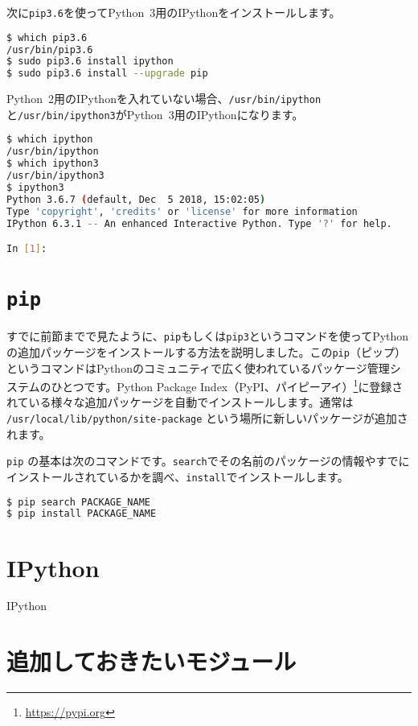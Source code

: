 次に\texttt{pip3.6}を使ってPython~3用のIPythonをインストールします。

\begin{lstlisting}[language=bash]
$ which pip3.6 
/usr/bin/pip3.6
$ sudo pip3.6 install ipython
$ sudo pip3.6 install --upgrade pip
\end{lstlisting}

Python~2用のIPythonを入れていない場合、\texttt{/usr/bin/ipython}と\texttt{/usr/bin/ipython3}がPython~3用のIPythonになります。

\begin{lstlisting}[language=bash]
$ which ipython
/usr/bin/ipython
$ which ipython3
/usr/bin/ipython3
$ ipython3 
Python 3.6.7 (default, Dec  5 2018, 15:02:05) 
Type 'copyright', 'credits' or 'license' for more information
IPython 6.3.1 -- An enhanced Interactive Python. Type '?' for help.

In [1]:
\end{lstlisting}

\section{\texttt{pip}}

すでに前節までで見たように、\texttt{pip}もしくは\texttt{pip3}というコマンドを使ってPythonの追加パッケージをインストールする方法を説明しました。この\texttt{pip}（ピップ）というコマンドはPythonのコミュニティで広く使われているパッケージ管理システムのひとつです。Python Package Index（PyPI、パイピーアイ）\footnote{\url{https://pypi.org}}に登録されている様々な追加パッケージを自動でインストールします。通常は \texttt{/usr/local/lib/python/site-package} という場所に新しいパッケージが追加されます。

\texttt{pip} の基本は次のコマンドです。\texttt{search}でその名前のパッケージの情報やすでにインストールされているかを調べ、\texttt{install}でインストールします。
\begin{lstlisting}[language=bash]
$ pip search PACKAGE_NAME
$ pip install PACKAGE_NAME
\end{lstlisting}  

\section{IPython}
IPython

\section{追加しておきたいモジュール}

